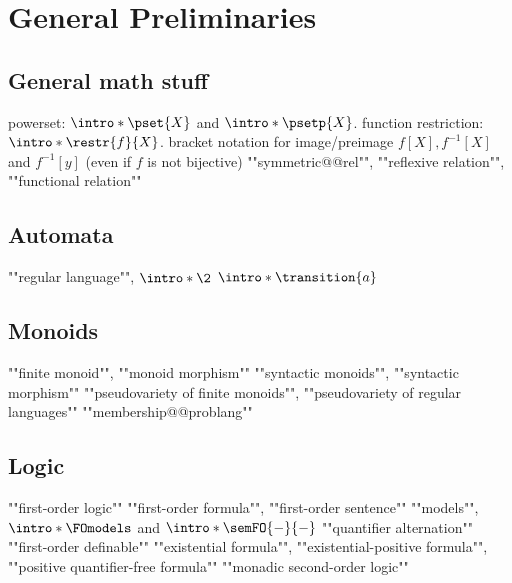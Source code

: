 \chapter{General Preliminaries}

\section{General math stuff}

\begin{itemize}
	\itemAP powerset: $\intro*\pset{X}$ and $\intro*\psetp{X}$.
	\itemAP function restriction: $\intro*\restr{f}{X}$.
	\itemAP bracket notation for image/preimage $f[X], f^{-1}[X]$ and $f^{-1}[y]$ (even if $f$ is not bijective)
	\itemAP ""symmetric@@rel"", ""reflexive relation"", ""functional relation""
\end{itemize}

\section{Automata}

\begin{itemize}
	\itemAP ""regular language"", $\intro*\2$
	\itemAP $\intro*\transition{a}$
\end{itemize}

\section{Monoids}

\begin{itemize}
	\itemAP ""finite monoid"", ""monoid morphism""
	\itemAP ""syntactic monoids"", ""syntactic morphism""
	\itemAP ""pseudovariety of finite monoids"", ""pseudovariety of regular languages""
	\itemAP ""membership@@problang""
\end{itemize}

\section{Logic}

\begin{itemize}
	\itemAP ""first-order logic""
	\itemAP ""first-order formula"", ""first-order sentence""
	\itemAP ""models"", $\intro*\FOmodels$ and $\intro*\semFO{-}{-}$
	\itemAP ""quantifier alternation""
	\itemAP ""first-order definable""
	\itemAP ""existential formula"", ""existential-positive formula"",
		""positive quantifier-free formula""
	\itemAP ""monadic second-order logic""
\end{itemize}

